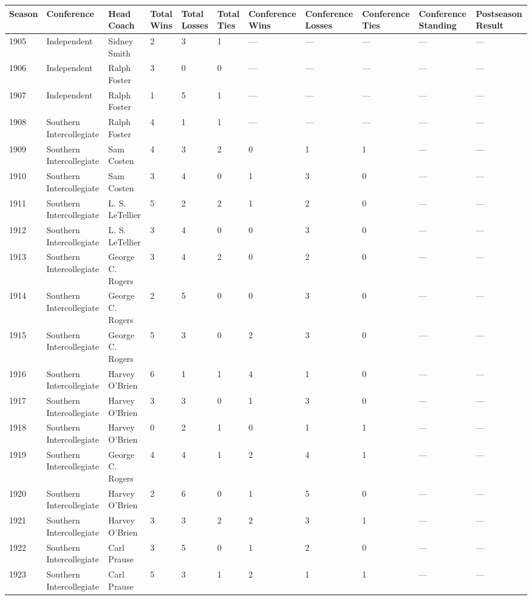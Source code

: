 \documentclass{article}
\begin{document}
\begin{tabular}{lllllllllll}
\toprule
Season & Conference & Head Coach & Total Wins & Total Losses & Total Ties & Conference Wins & Conference Losses & Conference Ties & Conference Standing & Postseason Result \\
\midrule
1905 & Independent & Sidney Smith & 2 & 3 & 1 & — & — & — & — & — \\
1906 & Independent & Ralph Foster & 3 & 0 & 0 & — & — & — & — & — \\
1907 & Independent & Ralph Foster & 1 & 5 & 1 & — & — & — & — & — \\
1908 & Southern Intercollegiate & Ralph Foster & 4 & 1 & 1 & — & — & — & — & — \\
1909 & Southern Intercollegiate & Sam Costen & 4 & 3 & 2 & 0 & 1 & 1 & — & — \\
1910 & Southern Intercollegiate & Sam Costen & 3 & 4 & 0 & 1 & 3 & 0 & — & — \\
1911 & Southern Intercollegiate & L. S. LeTellier & 5 & 2 & 2 & 1 & 2 & 0 & — & — \\
1912 & Southern Intercollegiate & L. S. LeTellier & 3 & 4 & 0 & 0 & 3 & 0 & — & — \\
1913 & Southern Intercollegiate & George C. Rogers & 3 & 4 & 2 & 0 & 2 & 0 & — & — \\
1914 & Southern Intercollegiate & George C. Rogers & 2 & 5 & 0 & 0 & 3 & 0 & — & — \\
1915 & Southern Intercollegiate & George C. Rogers & 5 & 3 & 0 & 2 & 3 & 0 & — & — \\
1916 & Southern Intercollegiate & Harvey O'Brien & 6 & 1 & 1 & 4 & 1 & 0 & — & — \\
1917 & Southern Intercollegiate & Harvey O'Brien & 3 & 3 & 0 & 1 & 3 & 0 & — & — \\
1918 & Southern Intercollegiate & Harvey O'Brien & 0 & 2 & 1 & 0 & 1 & 1 & — & — \\
1919 & Southern Intercollegiate & George C. Rogers & 4 & 4 & 1 & 2 & 4 & 1 & — & — \\
1920 & Southern Intercollegiate & Harvey O'Brien & 2 & 6 & 0 & 1 & 5 & 0 & — & — \\
1921 & Southern Intercollegiate & Harvey O'Brien & 3 & 3 & 2 & 2 & 3 & 1 & — & — \\
1922 & Southern Intercollegiate & Carl Prause & 3 & 5 & 0 & 1 & 2 & 0 & — & — \\
1923 & Southern Intercollegiate & Carl Prause & 5 & 3 & 1 & 2 & 1 & 1 & — & — \\

\end{tabular}
\end{document}
